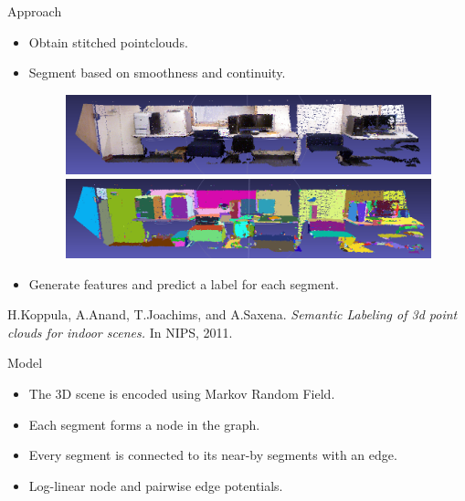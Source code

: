 \documentclass{beamer}
\begin{document}
\begin{frame}{Approach}
	\begin{itemize}
		\item Obtain stitched pointclouds.
		\item Segment based on smoothness and continuity. 
		\begin{figure}
		       \includegraphics[width=.9\linewidth]{mengo.png}\\
		       \includegraphics[width=.9\linewidth]{meng_segmented.png}
	         \end{figure}
		\item Generate features and predict a label for each segment.
	\end{itemize}
	
	\vskip 0.25in
{\scriptsize
 H.Koppula, A.Anand, T.Joachims, and A.Saxena. \emph{Semantic Labeling of 3d point clouds for indoor scenes.} In NIPS, 2011.\\
}
\end{frame}


\begin{frame}{Model}
\begin{itemize}
 \item The 3D scene is encoded using Markov Random Field.  
 \item Each segment forms a node in the graph.
 \item Every segment is connected to its near-by segments with an edge.
 \item Log-linear node and pairwise edge potentials.
\end{itemize}
\end{frame}
\end{document}
